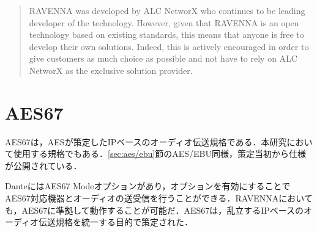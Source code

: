 \begin{quotation}
  RAVENNA was developed by ALC NetworX who continues to be leading developer of the technology. However, given that RAVENNA is an open technology based on existing standards, this means that anyone is free to develop their own solutions. Indeed, this is actively encouraged in order to give customers as much choice as possible and not have to rely on ALC NetworX as the exclusive solution provider.
\end{quotation}

\section{AES67}

AES67は，AESが策定したIPベースのオーディオ伝送規格である．本研究において使用する規格でもある．\ref{sec:aes/ebu}節のAES/EBU同様，策定当初から仕様が公開されている．

DanteにはAES67 Modeオプションがあり，オプションを有効にすることでAES67対応機器とオーディオの送受信を行うことができる．RAVENNAにおいても，AES67に準拠して動作することが可能だ．AES67は，乱立するIPベースのオーディオ伝送規格を統一する目的で策定された．
